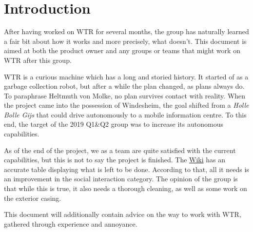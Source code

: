 \section{Introduction}
\label{sec::intro}
After having worked on WTR for several months, the group has naturally learned a fair bit about how it works and more precisely, what doesn't.
This document is aimed at both the product owner and any groups or teams that might work on WTR after this group.

WTR is a curious machine which has a long and storied history.
It started of as a garbage collection robot, but after a while the plan changed, as plans always do.
To paraphrase Heltmuth von Molke, no plan survives contact with reality.
When the project came into the possession of Windesheim, the goal shifted from a \textit{Holle Bolle Gijs} that could drive autonomously to a mobile information centre.
To this end, the target of the 2019 Q1\&Q2 group was to increase its autonomous capabilities.

As of the end of the project, we as a team are quite satisfied with the current capabilities, but this is not to say the project is finished.
The \href{https://windesheim-willy.github.io/WillyWiki/}{Wiki} has an accurate table displaying what is left to be done.
According to that, all it needs is an improvement in the social interaction category.
The opinion of the group is that while this is true, it also needs a thorough cleaning, as well as some work on the exterior casing.

This document will additionally contain advice on the way to work with WTR, gathered through experience and annoyance.
\newpage 